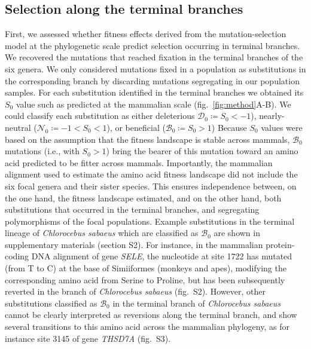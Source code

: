 \documentclass{article}
\newcommand{\Sphy}{S_{0}}
\newcommand{\SphyDel}{\mathcal{D}_0}
\newcommand{\SphyNeu}{\mathcal{N}_0}
\newcommand{\SphyBen}{\mathcal{B}_0}
\begin{document}
    \subsection*{Selection along the terminal branches}
    First, we assessed whether fitness effects derived from the mutation-selection model at the phylogenetic scale predict selection occurring in terminal branches.
    We recovered the mutations that reached fixation in the terminal branches of the six genera.
    We only considered mutations fixed in a population as substitutions in the corresponding branch by discarding mutations segregating in our population samples.
    For each substitution identified in the terminal branches we obtained its $\Sphy$ value such as predicted at the mammalian scale (fig.~\ref{fig:method}A-B).
    We could classify each substitution as either deleterious $\SphyDel \coloneqq \Sphy < -1$), nearly-neutral ($\SphyNeu \coloneqq -1 < \Sphy <1$), or beneficial ($\SphyBen \coloneqq \Sphy > 1$)
    Because $\Sphy$ values were based on the assumption that the fitness landscape is stable across mammals, $\SphyBen$ mutations (i.e., with $\Sphy>1$) bring the bearer of this mutation toward an amino acid predicted to be fitter across mammals.
    Importantly, the mammalian alignment used to estimate the amino acid fitness landscape did not include the six focal genera and their sister species.
    This ensures independence between, on the one hand, the fitness landscape estimated, and on the other hand, both substitutions that occurred in the terminal branches, and segregating polymorphisms of the focal populations.
    Example substitutions in the terminal lineage of \textit{Chlorocebus sabaeus} which are classified as $\SphyBen$ are shown in supplementary materials (section S2).
    For instance, in the mammalian protein-coding DNA alignment of gene \textit{SELE}, the nucleotide at site 1722 has mutated (from T to C) at the base of Simiiformes (monkeys and apes), modifying the corresponding amino acid from Serine to Proline, but has been subsequently reverted in the branch of \textit{Chlorocebus sabaeus} (fig.~S2).
    However, other substitutions classified as $\SphyBen$ in the terminal branch of \textit{Chlorocebus sabaeus} cannot be clearly interpreted as reversions along the terminal branch, and show several transitions to this amino acid across the mammalian phylogeny, as for instance site 3145 of gene \textit{THSD7A} (fig.~S3).
\end{document}
